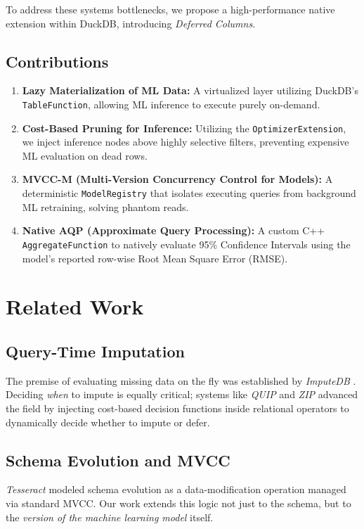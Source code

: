 \documentclass[conference]{IEEEtran}
\begin{document}
To address these systems bottlenecks, we propose a high-performance native extension within DuckDB, introducing \textit{Deferred Columns}. 

\subsection{Contributions}
\begin{enumerate}
    \item \textbf{Lazy Materialization of ML Data:} A virtualized layer utilizing DuckDB's \texttt{TableFunction}, allowing ML inference to execute purely on-demand.
    \item \textbf{Cost-Based Pruning for Inference:} Utilizing the \texttt{OptimizerExtension}, we inject inference nodes above highly selective filters, preventing expensive ML evaluation on dead rows.
    \item \textbf{MVCC-M (Multi-Version Concurrency Control for Models):} A deterministic \texttt{ModelRegistry} that isolates executing queries from background ML retraining, solving phantom reads.
    \item \textbf{Native AQP (Approximate Query Processing):} A custom C++ \texttt{AggregateFunction} to natively evaluate 95\% Confidence Intervals using the model's reported row-wise Root Mean Square Error (RMSE).
\end{enumerate}

\section{Related Work}

\subsection{Query-Time Imputation}
The premise of evaluating missing data on the fly was established by \textit{ImputeDB} \cite{imputedb}. Deciding \textit{when} to impute is equally critical; systems like \textit{QUIP} \cite{quip} and \textit{ZIP} \cite{zip} advanced the field by injecting cost-based decision functions inside relational operators to dynamically decide whether to impute or defer. 

\subsection{Schema Evolution and MVCC}
\textit{Tesseract} \cite{tesseract} modeled schema evolution as a data-modification operation managed via standard MVCC. Our work extends this logic not just to the schema, but to the \textit{version of the machine learning model} itself.
\end{document}
